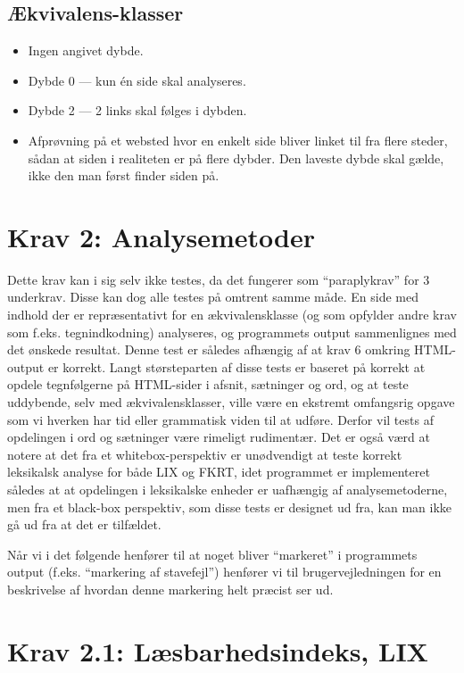 \documentclass[a4paper,oneside,article, titlepage]{memoir}
\begin{document}
\subsection{Ækvivalens-klasser}
\begin{itemize}
\item Ingen angivet dybde.
\item Dybde 0 --- kun én side skal analyseres.
\item Dybde 2 --- 2 links skal følges i dybden.
\item Afprøvning på et websted hvor en enkelt side bliver linket til
  fra flere steder, sådan at siden i realiteten er på flere
  dybder. Den laveste dybde skal gælde, ikke den man først finder
  siden på.
\end{itemize}

\section*{Krav 2: Analysemetoder}

Dette krav kan i sig selv ikke testes, da det fungerer som
``paraplykrav'' for 3 underkrav. Disse kan dog alle testes på omtrent
samme måde. En side med indhold der er repræsentativt for en
ækvivalensklasse (og som opfylder andre krav som
f.eks. tegnindkodning) analyseres, og programmets output sammenlignes
med det ønskede resultat. Denne test er således afhængig af at krav 6
omkring HTML-output er korrekt. Langt størsteparten af disse tests er
baseret på korrekt at opdele tegnfølgerne på HTML-sider i afsnit,
sætninger og ord, og at teste uddybende, selv med ækvivalensklasser,
ville være en ekstremt omfangsrig opgave som vi hverken har tid eller
grammatisk viden til at udføre. Derfor vil tests af opdelingen i ord
og sætninger være rimeligt rudimentær. Det er også værd at notere at
det fra et whitebox-perspektiv er unødvendigt at teste korrekt
leksikalsk analyse for både LIX og FKRT, idet programmet er
implementeret således at at opdelingen i leksikalske enheder er
uafhængig af analysemetoderne, men fra et black-box perspektiv, som
disse tests er designet ud fra, kan man ikke gå ud fra at det er
tilfældet.

Når vi i det følgende henfører til at noget bliver ``markeret'' i
programmets output (f.eks. ``markering af stavefejl'') henfører vi til
brugervejledningen for en beskrivelse af hvordan denne markering helt
præcist ser ud.

\section*{Krav 2.1: Læsbarhedsindeks, LIX}
\end{document}
